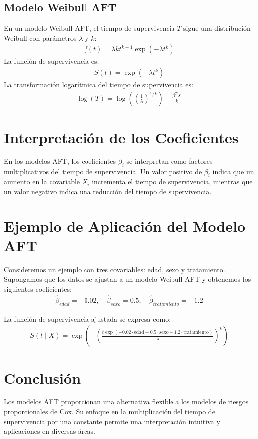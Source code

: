 \documentclass[a4paper]{report} %
\begin{document}
\subsection{Modelo Weibull AFT}
En un modelo Weibull AFT, el tiempo de supervivencia $T$ sigue una distribuci\'on Weibull con par\'ametros $\lambda$ y $k$:
\begin{eqnarray*}
f(t) = \lambda k t^{k-1} \exp(-\lambda t^k)
\end{eqnarray*}
La funci\'on de supervivencia es:
\begin{eqnarray*}
S(t) = \exp(-\lambda t^k)
\end{eqnarray*}
La transformaci\'on logar\'itmica del tiempo de supervivencia es:
\begin{eqnarray*}
\log(T) = \log\left(\left(\frac{1}{\lambda}\right)^{1/k}\right) + \frac{\beta^T X}{k}
\end{eqnarray*}

\section{Interpretaci\'on de los Coeficientes}
En los modelos AFT, los coeficientes $\beta_i$ se interpretan como factores multiplicativos del tiempo de supervivencia. Un valor positivo de $\beta_i$ indica que un aumento en la covariable $X_i$ incrementa el tiempo de supervivencia, mientras que un valor negativo indica una reducci\'on del tiempo de supervivencia.

\section{Ejemplo de Aplicaci\'on del Modelo AFT}
Consideremos un ejemplo con tres covariables: edad, sexo y tratamiento. Supongamos que los datos se ajustan a un modelo Weibull AFT y obtenemos los siguientes coeficientes:
\begin{eqnarray*}
\hat{\beta}_{edad} = -0.02, \quad \hat{\beta}_{sexo} = 0.5, \quad \hat{\beta}_{tratamiento} = -1.2
\end{eqnarray*}

La funci\'on de supervivencia ajustada se expresa como:
\begin{eqnarray*}
S(t \mid X) = \exp\left(-\left(\frac{t \exp(-0.02 \cdot \text{edad} + 0.5 \cdot \text{sexo} - 1.2 \cdot \text{tratamiento})}{\lambda}\right)^k\right)
\end{eqnarray*}

\section{Conclusi\'on}
Los modelos AFT proporcionan una alternativa flexible a los modelos de riesgos proporcionales de Cox. Su enfoque en la multiplicaci\'on del tiempo de supervivencia por una constante permite una interpretaci\'on intuitiva y aplicaciones en diversas \'areas.
\end{document}
